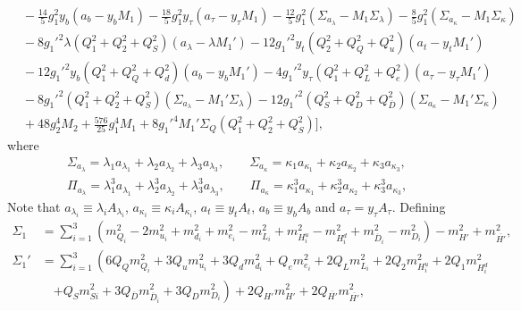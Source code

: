 \documentclass[preprint,amsmath,amssymb,aps,superscriptaddress,prd,showpacs,floatfix,nofootinbib]{revtex4-1}
\begin{document}
\begin{subequations}
\begin{align}
&{}-\frac{14}{5}g_1^2y_b\left ( a_b-y_bM_1\right )-\frac{18}{5}g_1^2y_\tau\left ( a_\tau-y_\tau M_1\right )-\frac{12}{5}g_1^2\left ( \Sigma_{a_\lambda}-M_1\Sigma_\lambda\right )-\frac{8}{5}g_1^2\left ( \Sigma_{a_\kappa}-M_1\Sigma_\kappa\right )\nonumber\\
&{}-8g_1'^2\lambda\left ( Q_1^2+Q_2^2+Q_S^2\right )\left ( a_\lambda-\lambda M_1'\right )-12g_1'^2y_t\left ( Q_2^2+Q_Q^2+Q_u^2\right )\left ( a_t-y_tM_1'\right )\nonumber\\
&{}-12g_1'^2y_b\left ( Q_1^2+Q_Q^2+Q_d^2\right )\left ( a_b-y_bM_1'\right )-4g_1'^2y_\tau\left ( Q_1^2+Q_L^2+Q_e^2\right )\left ( a_\tau-y_\tau M_1'\right )\nonumber\\
&{}-8g_1'^2\left ( Q_1^2+Q_2^2+Q_S^2\right )\left ( \Sigma_{a_\lambda}-M_1'\Sigma_\lambda \right )-12g_1'^2\left ( Q_S^2+Q_D^2+Q_{\overline{D}}^2\right )\left (\Sigma_{a_\kappa}-M_1'\Sigma_{\kappa}\right )\nonumber\\
&{}+48g_2^4M_2+\frac{576}{25}g_1^4M_1+8g_1'^4M_1'\Sigma_Q\left ( Q_1^2+Q_2^2+Q_S^2\right )\bigg ],\label{eq:USSMTLambdaOt2Coeff}
\end{align}
\end{subequations}
where
\begin{align*}
&\Sigma_{a_\lambda}=\lambda_1 a_{\lambda_1}+\lambda_2 a_{\lambda_2}+\lambda_3 a_{\lambda_3},\qquad \Sigma_{a_\kappa}=\kappa_1 a_{\kappa_1}+\kappa_2 a_{\kappa_2}+\kappa_3 a_{\kappa_3},\\
&\Pi_{a_\lambda}=\lambda_1^3 a_{\lambda_1}+\lambda_2^3 a_{\lambda_2}+\lambda_3^3 a_{\lambda_3},\qquad \Pi_{a_\kappa}=\kappa_1^3 a_{\kappa_1}+\kappa_2^3 a_{\kappa_2}+\kappa_3^3 a_{\kappa_3},
\end{align*}
Note that $a_{\lambda_i}\equiv\lambda_i A_{\lambda_i}$, $a_{\kappa_i}\equiv\kappa_i A_{\kappa_i}$, $a_t\equiv y_t A_t$, $a_b\equiv y_b A_b$ and $a_\tau= y_\tau A_\tau$. Defining 
\begin{align}
\Sigma_1&=\sum_{i=1}^3\left ( m_{Q_i}^2-2m_{u_i}^2+m_{d_i}^2+m_{e_i}^2-m_{L_i}^2+m_{H_i^u}^2-m_{H_i^d}^2+m_{\overline{D}_i}^2-m_{D_i}^2\right )-m_{H'}^2+m_{\overline{H'}}^2,\label{eq:USSMGaugeSigmaTerm1}\\
\Sigma_1'&=\sum_{i=1}^3\left ( 6Q_Qm_{Q_i}^2+3Q_um_{u_i}^2+3Q_dm_{d_i}^2+Q_em_{e_i}^2+2Q_Lm_{L_i}^2+2Q_2m_{H_i^u}^2+2Q_1m_{H_i^d}^2\right.\nonumber\\
&\quad{}\left.+Q_Sm_{Si}^2+3Q_{\overline{D}}m_{\overline{D}_i}^2+3Q_Dm_{D_i}^2\right )+2Q_{H'}m_{H'}^2+2Q_{\overline{H'}}m_{\overline{H'}}^2,\label{eq:USSMGaugeSigmaTerm1Pr}
\end{align}
\end{document}
